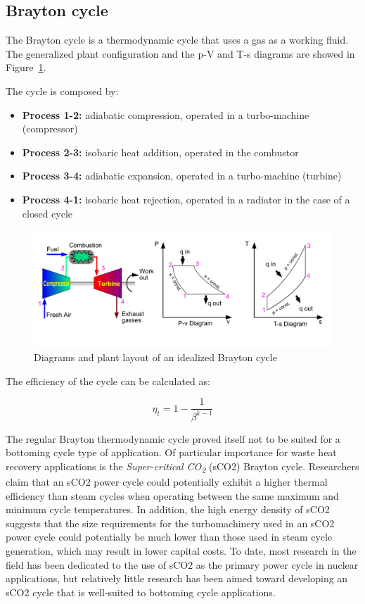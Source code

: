 \subsection{Brayton cycle}

The Brayton cycle is a thermodynamic cycle that uses a gas as a working fluid. The generalized plant configuration and the p-V and T-s diagrams are showed in Figure~\ref{fig:brayton_cycle}.

The cycle is composed by:

\begin{itemize}
\item \textbf{Process 1-2:} adiabatic compression, operated in a turbo-machine (compressor)
\item \textbf{Process 2-3:} isobaric heat addition, operated in the combustor
\item \textbf{Process 3-4:} adiabatic expansion, operated in a turbo-machine (turbine)
\item \textbf{Process 4-1:} isobaric heat rejection, operated in a radiator in the case of a closed cycle
\end{itemize}

\begin{figure}[ht]
  \centering
  \includegraphics[width=\textwidth]{figures/review/brayton_cycle.jpg}
  \caption{Diagrams and plant layout of an idealized Brayton cycle\label{fig:brayton_cycle} }
\end{figure}


The efficiency of the cycle can be calculated as:

\begin{equation}
  \eta_{t}=1-\frac{1}{\beta^{k-1}}
\end{equation}

The regular Brayton thermodynamic cycle proved itself not to be suited for a bottoming cycle type of application. Of particular importance for waste heat recovery applications is the \emph{Super-critical CO\textsubscript{2}} (sCO2) Brayton cycle. Researchers claim \cite{Kimzey2012} that an sCO2 power cycle could potentially exhibit a higher thermal efficiency than steam cycles when operating between the same maximum and minimum cycle temperatures. In addition, the high energy density of sCO2 suggests that the size requirements for the turbomachinery used in an sCO2 power cycle could potentially be much lower than those used in steam cycle generation, which may result in lower capital costs. To date, most research in the field has been dedicated to the use of sCO2 as the primary power cycle in nuclear applications, but relatively little research has been aimed toward developing an sCO2 cycle that is well-suited to bottoming cycle applications.

